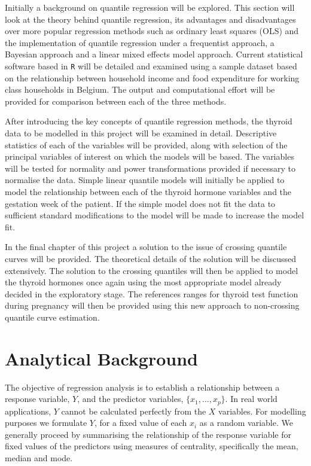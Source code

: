 \documentclass[12pt,a4paper]{report}
\begin{document}
Initially a background on quantile regression will be explored. This section will look at the theory behind quantile regression, its advantages and disadvantages over more popular regression methods such as ordinary least squares (OLS) and the implementation of quantile regression under a frequentist approach, a Bayesian approach and a linear mixed effects model approach. Current statistical software based in {\small{\verb"R"}} \citep{R} will be detailed and examined using a sample dataset based on the relationship between household income and food expenditure for working class households in Belgium. The output and computational effort will be provided for comparison between each of the three methods.
\vspace{2mm}

After introducing the key concepts of quantile regression methods, the thyroid data to be modelled in this project will be examined in detail. Descriptive statistics of each of the variables will be provided, along with selection of the principal variables of interest on which the models will be based. The variables will be tested for normality and power transformations provided if necessary to normalise the data. Simple linear quantile models will initially be applied to model the relationship between each of the thyroid hormone variables and the gestation week of the patient. If the simple model does not fit the data to sufficient standard modifications to the model will be made to increase the model fit.
\vspace{2mm}

In the final chapter of this project a solution to the issue of crossing quantile curves will be provided. The theoretical details of the solution will be discussed extensively. The solution to the crossing quantiles will then be applied to model the thyroid hormones once again using the most appropriate model already decided in the exploratory stage. The references ranges for thyroid test function during pregnancy will then be provided using this new approach to non-crossing quantile curve estimation.

\chapter{Analytical Background}\label{Background}
The objective of regression analysis is to establish a relationship between a response variable, $Y$, and the predictor variables, $\{x_{1},\ldots,x_{p}\}$. In real world applications, $Y$ cannot be calculated perfectly from the $X$ variables. For modelling purposes we formulate $Y$, for a fixed value of each $x_{i}$ as a random variable. We generally proceed by summarising the relationship of the response variable for fixed values of the predictors using measures of centrality, specifically the mean, median and mode.
\vspace{2mm}
\end{document}
